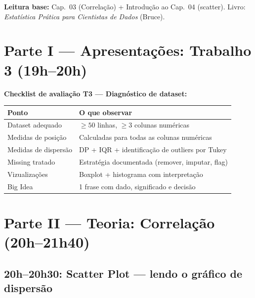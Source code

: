 \begin{NoteBox}
\textbf{Leitura base:} Cap.\ 03 (Correlação) + Introdução ao Cap.\ 04 (scatter).
Livro: \textit{Estatística Prática para Cientistas de Dados} (Bruce).
\end{NoteBox}

\section{Parte I — Apresentações: Trabalho 3 (19h–20h)}

\begin{BoardBox}
\textbf{Checklist de avaliação T3 — Diagnóstico de dataset:}
\begin{tabular}{|p{4.5cm}|p{8.5cm}|}
\hline
\textbf{Ponto} & \textbf{O que observar} \\
\hline
Dataset adequado & $\geq 50$ linhas, $\geq 3$ colunas numéricas \\
Medidas de posição & Calculadas para todas as colunas numéricas \\
Medidas de dispersão & DP + IQR + identificação de outliers por Tukey \\
Missing tratado & Estratégia documentada (remover, imputar, flag) \\
Vizualizações & Boxplot + histograma com interpretação \\
Big Idea & 1 frase com dado, significado e decisão \\
\hline
\end{tabular}
\end{BoardBox}

\section{Parte II — Teoria: Correlação (20h–21h40)}

\subsection{20h–20h30: Scatter Plot — lendo o gráfico de dispersão}

